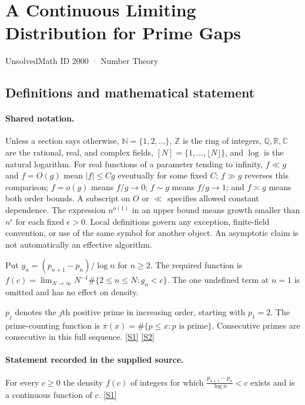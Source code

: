 \documentclass[11pt,a4paper]{article}
\newcommand{\N}{\mathbb{N}}
\newcommand{\Z}{\mathbb{Z}}
\newcommand{\Q}{\mathbb{Q}}
\newcommand{\R}{\mathbb{R}}
\newcommand{\C}{\mathbb{C}}
\newcommand{\sref}[2]{\hyperlink{source:#1:#2}{[S#2]}}
\begin{document}

\setcounter{section}{1999}

\section{A Continuous Limiting Distribution for Prime Gaps}\label{2000}

{\small\sffamily UnsolvedMath ID 2000 · Number Theory}

\subsection{Definitions and mathematical statement}

\paragraph{Shared notation.}Unless a section says otherwise, $\N=\{1,2,\ldots\}$,
$\Z$ is the ring of integers, $\Q,\R,\C$ are the rational, real, and complex
fields, $[N]=\{1,\ldots,\lfloor N\rfloor\}$, and $\log$ is the natural
logarithm. For real functions of a parameter tending to infinity,
$f\ll g$ and $f=O(g)$ mean $|f|\leq Cg$ eventually for some fixed $C$;
$f\gg g$ reverses this comparison; $f=o(g)$ means $f/g\to0$;
$f\sim g$ means $f/g\to1$; and $f\asymp g$ means both order bounds.
A subscript on $O$ or $\ll$ specifies allowed constant dependence.
The expression $n^{o(1)}$ in an upper bound means growth smaller than
$n^\epsilon$ for each fixed $\epsilon>0$. Local definitions govern any
exception, finite-field convention, or use of the same symbol for another
object. An asymptotic claim is not automatically an effective algorithm.



Put $g_n=(p_{n+1}-p_n)/\log n$ for $n\geq2$. The required function is $f(c)=\lim_{N\to\infty}N^{-1}\#\{2\leq n\leq N:g_n<c\}$. The one undefined term at $n=1$ is omitted and has no effect on density.

$p_j$ denotes the $j$th positive prime in increasing order, starting with $p_1=2$. The prime-counting function is $\pi(x)=\#\{p\leq x:p\text{ is prime}\}$. Consecutive primes are consecutive in this full sequence. \sref{2000}{1} \sref{2000}{2}

\paragraph{Statement recorded in the supplied source.}
For every $c\geq 0$ the density $f(c)$ of integers for which $ \frac{p_{n+1}-p_n}{\log n}< c $ exists and is a continuous function of $c$. \sref{2000}{1}
\end{document}
